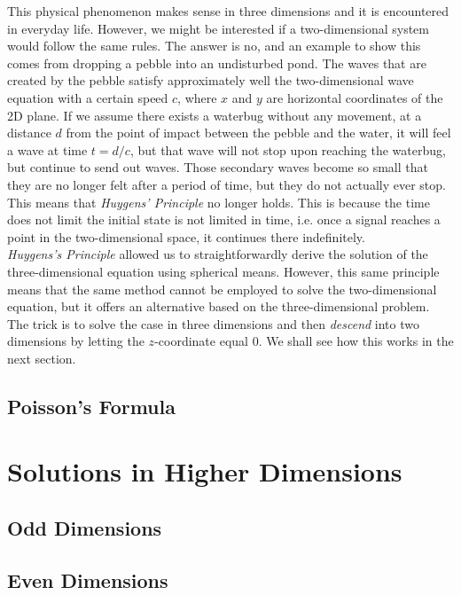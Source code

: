 \documentclass[12pt]{article}
\numberwithin{equation}{section}
\begin{document}
This physical phenomenon makes sense in three dimensions and it is encountered in everyday life. However, we might be interested if a two-dimensional system would follow
the same rules. The answer is no, and an example to show this comes from dropping a pebble into an undisturbed pond. The waves that are created by the pebble satisfy 
approximately well the two-dimensional wave equation with a certain speed $c$, where $x$ and $y$ are horizontal coordinates of the 2D plane. If we assume there exists
a waterbug without any movement, at a distance $d$ from the point of impact between the pebble and the water, it will feel a wave at time $t=d/c$, but that wave will
not stop upon reaching the waterbug, but continue to send out waves. Those secondary waves become so small that they are no longer felt after a period of time, but they 
do not actually ever stop. \cite{Str} This means that \emph{Huygens' Principle} no longer holds. This is because the time does not limit the initial state is not limited 
in time, i.e. once a signal reaches a point in the two-dimensional space, it continues there indefinitely. \cite{Hil}
\\

\emph{Huygens's Principle} allowed us to straightforwardly derive the solution of the three-dimensional equation using spherical means. However, this same principle
means that the same method cannot be employed to solve the two-dimensional equation, but it offers an alternative based on the three-dimensional problem. The trick is
to solve the case in three dimensions and then \emph{descend} into two dimensions by letting the $z$-coordinate equal $0$. \cite{Ev} We shall see how this works in the 
next section. 

\subsection{Poisson's Formula}

\section{Solutions in Higher Dimensions}

\subsection{Odd Dimensions}
\subsection{Even Dimensions}
\end{document}
